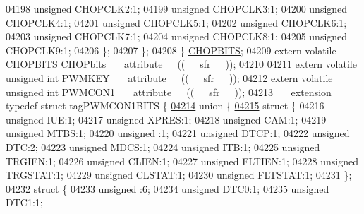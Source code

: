 \begin{DoxyCode}
04198       \textcolor{keywordtype}{unsigned} CHOPCLK2:1;
04199       \textcolor{keywordtype}{unsigned} CHOPCLK3:1;
04200       \textcolor{keywordtype}{unsigned} CHOPCLK4:1;
04201       \textcolor{keywordtype}{unsigned} CHOPCLK5:1;
04202       \textcolor{keywordtype}{unsigned} CHOPCLK6:1;
04203       \textcolor{keywordtype}{unsigned} CHOPCLK7:1;
04204       \textcolor{keywordtype}{unsigned} CHOPCLK8:1;
04205       \textcolor{keywordtype}{unsigned} CHOPCLK9:1;
04206     \};
04207   \};
04208 \} \hyperlink{a00014_df/d95/a00299}{CHOPBITS};
04209 \textcolor{keyword}{extern} \textcolor{keyword}{volatile} \hyperlink{a00014_df/d95/a00299}{CHOPBITS} CHOPbits \hyperlink{a00015_a493c46f03454991ccc5aa7a6e1dfb2a7}{\_\_attribute\_\_}((\_\_sfr\_\_));
04210 
04211 \textcolor{keyword}{extern} \textcolor{keyword}{volatile} \textcolor{keywordtype}{unsigned} \textcolor{keywordtype}{int}  PWMKEY \hyperlink{a00015_a493c46f03454991ccc5aa7a6e1dfb2a7}{\_\_attribute\_\_}((\_\_sfr\_\_));
04212 \textcolor{keyword}{extern} \textcolor{keyword}{volatile} \textcolor{keywordtype}{unsigned} \textcolor{keywordtype}{int}  PWMCON1 \hyperlink{a00015_a493c46f03454991ccc5aa7a6e1dfb2a7}{\_\_attribute\_\_}((\_\_sfr\_\_));
\hypertarget{a00015_source_l04213}{}\hyperlink{a00014}{04213} \_\_extension\_\_ \textcolor{keyword}{typedef} \textcolor{keyword}{struct }tagPWMCON1BITS \{
\hypertarget{a00015_source_l04214}{}\hyperlink{a00015}{04214}   \textcolor{keyword}{union }\{
\hypertarget{a00015_source_l04215}{}\hyperlink{a00015}{04215}     \textcolor{keyword}{struct }\{
04216       \textcolor{keywordtype}{unsigned} IUE:1;
04217       \textcolor{keywordtype}{unsigned} XPRES:1;
04218       \textcolor{keywordtype}{unsigned} CAM:1;
04219       \textcolor{keywordtype}{unsigned} MTBS:1;
04220       \textcolor{keywordtype}{unsigned} :1;
04221       \textcolor{keywordtype}{unsigned} DTCP:1;
04222       \textcolor{keywordtype}{unsigned} DTC:2;
04223       \textcolor{keywordtype}{unsigned} MDCS:1;
04224       \textcolor{keywordtype}{unsigned} ITB:1;
04225       \textcolor{keywordtype}{unsigned} TRGIEN:1;
04226       \textcolor{keywordtype}{unsigned} CLIEN:1;
04227       \textcolor{keywordtype}{unsigned} FLTIEN:1;
04228       \textcolor{keywordtype}{unsigned} TRGSTAT:1;
04229       \textcolor{keywordtype}{unsigned} CLSTAT:1;
04230       \textcolor{keywordtype}{unsigned} FLTSTAT:1;
04231     \};
\hypertarget{a00015_source_l04232}{}\hyperlink{a00015}{04232}     \textcolor{keyword}{struct }\{
04233       \textcolor{keywordtype}{unsigned} :6;
04234       \textcolor{keywordtype}{unsigned} DTC0:1;
04235       \textcolor{keywordtype}{unsigned} DTC1:1;

\end{DoxyCode}
